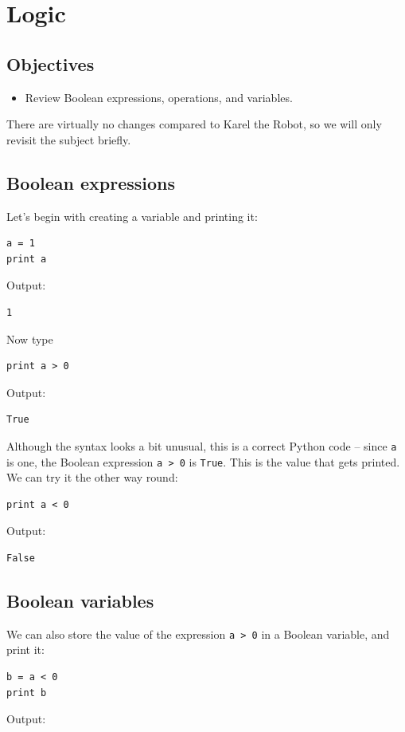 \section{Logic}

\subsection{Objectives}

\begin{itemize}
\item Review Boolean expressions, operations, and variables.
\end{itemize}
There are virtually no changes compared to Karel the Robot, so we will 
only revisit the subject briefly. 

\subsection{Boolean expressions}

Let's begin with creating a variable 
and printing it:

\begin{verbatim}
a = 1
print a
\end{verbatim}
Output:

\begin{verbatim}
1
\end{verbatim}
Now type

\begin{verbatim}
print a > 0
\end{verbatim}
Output:

\begin{verbatim}
True
\end{verbatim}
Although the syntax looks a bit unusual, this is a correct
Python code -- since {\tt a} is one, the Boolean expression {\tt a > 0}
is {\tt True}. This is the value that gets printed. We can try it the other 
way round:

\begin{verbatim}
print a < 0
\end{verbatim}
Output:

\begin{verbatim}
False
\end{verbatim}

\subsection{Boolean variables}

We can also store the value of the expression {\tt a > 0} in a Boolean variable,
and print it:
\begin{verbatim}
b = a < 0
print b
\end{verbatim}
Output:

